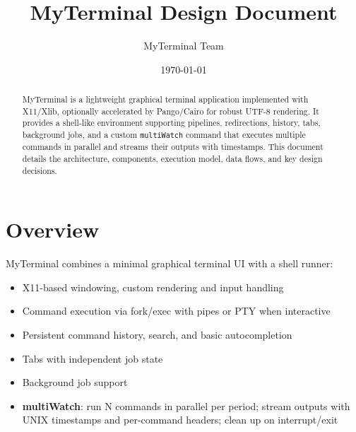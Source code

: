 \documentclass[11pt,a4paper]{article}
\title{MyTerminal Design Document}
\author{MyTerminal Team}
\date{\today}
\begin{document}
\maketitle

\begin{abstract}
MyTerminal is a lightweight graphical terminal application implemented with X11/Xlib, optionally accelerated by Pango/Cairo for robust UTF-8 rendering. It provides a shell-like environment supporting pipelines, redirections, history, tabs, background jobs, and a custom \texttt{multiWatch} command that executes multiple commands in parallel and streams their outputs with timestamps. This document details the architecture, components, execution model, data flows, and key design decisions.
\end{abstract}

\tableofcontents

\section{Overview}
MyTerminal combines a minimal graphical terminal UI with a shell runner:
\begin{itemize}[leftmargin=*]
  \item X11-based windowing, custom rendering and input handling
  \item Command execution via fork/exec with pipes or PTY when interactive
  \item Persistent command history, search, and basic autocompletion
  \item Tabs with independent job state
  \item Background job support
  \item \textbf{multiWatch}: run N commands in parallel per period; stream outputs with UNIX timestamps and per-command headers; clean up on interrupt/exit
\end{itemize}
\end{document}
